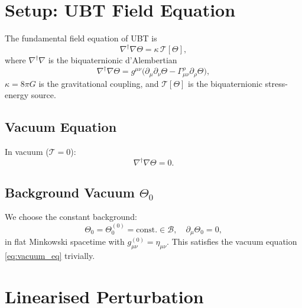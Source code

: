 \documentclass[11pt,a4paper]{article}
\theoremstyle{definition}
\theoremstyle{remark}
\begin{document}
\section{Setup: UBT Field Equation}
\label{sec:setup}

The fundamental field equation of UBT is
\begin{equation}
  \nabla^\dagger\nabla\Theta = \kappa\,\mathcal{T}[\Theta],
  \label{eq:ubt_field}
\end{equation}
where $\nabla^\dagger\nabla$ is the biquaternionic d'Alembertian
\begin{equation}
  \nabla^\dagger\nabla\Theta
  = g^{\mu\nu}\bigl(\partial_\mu\partial_\nu\Theta
    - \Gamma^\rho_{\mu\nu}\partial_\rho\Theta\bigr),
  \label{eq:dAlembertian}
\end{equation}
$\kappa = 8\pi G$ is the gravitational coupling, and $\mathcal{T}[\Theta]$
is the biquaternionic stress-energy source.

\subsection{Vacuum Equation}

In vacuum ($\mathcal{T} = 0$):
\begin{equation}
  \nabla^\dagger\nabla\Theta = 0.
  \label{eq:vacuum_eq}
\end{equation}

\subsection{Background Vacuum $\Theta_0$}

We choose the constant background:
\begin{equation}
  \Theta_0 = \Theta_0^{(0)} = \mathrm{const.} \in \mathcal{B},
  \quad \partial_\mu\Theta_0 = 0,
  \label{eq:bg_vacuum}
\end{equation}
in flat Minkowski spacetime with $g_{\mu\nu}^{(0)} = \eta_{\mu\nu}$.  This
satisfies the vacuum equation \eqref{eq:vacuum_eq} trivially.

\section{Linearised Perturbation}
\label{sec:linearised}
\end{document}
